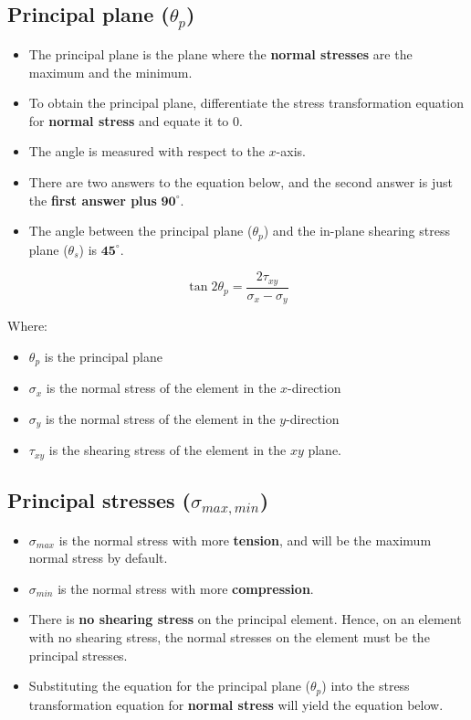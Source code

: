 \documentclass[11pt]{article}
\begin{document}
\subsection{Principal plane (\(\theta_p\))}
\label{sec:orgc1cdc88}
\begin{itemize}
\item The principal plane is the plane where the \textbf{normal stresses} are the maximum and the minimum.
\item To obtain the principal plane, differentiate the stress transformation equation for \textbf{normal stress} and equate it to 0.
\item The angle is measured with respect to the \(x\)-axis.
\item There are two answers to the equation below, and the second answer is just the \textbf{first answer plus} \(\boldsymbol{90^{\circ}}\).
\item The angle between the principal plane (\(\theta_p\)) and the in-plane shearing stress plane (\(\theta_s\)) is \(\boldsymbol{45^{\circ}}\).
\end{itemize}

\[\tan 2 \theta_p = \frac{2 \tau_{xy}}{\sigma_x - \sigma_y}\]

Where:
\begin{itemize}
\item \(\theta_p\) is the principal plane
\item \(\sigma_x\) is the normal stress of the element in the \(x\)-direction
\item \(\sigma_y\) is the normal stress of the element in the \(y\)-direction
\item \(\tau_{xy}\) is the shearing stress of the element in the \(xy\) plane.
\end{itemize}

\newpage
\subsection{Principal stresses (\(\sigma_{max, min}\))}
\label{sec:orgc96bf3b}
\begin{itemize}
\item \(\sigma_{max}\) is the normal stress with more \textbf{tension}, and will be the maximum normal stress by default.
\item \(\sigma_{min}\) is the normal stress with more \textbf{compression}.
\item There is \textbf{no shearing stress} on the principal element. Hence, on an element with no shearing stress, the normal stresses on the element must be the principal stresses.
\item Substituting the equation for the principal plane (\(\theta_p\)) into the stress transformation equation for \textbf{normal stress} will yield the equation below.
\end{itemize}
\end{document}
